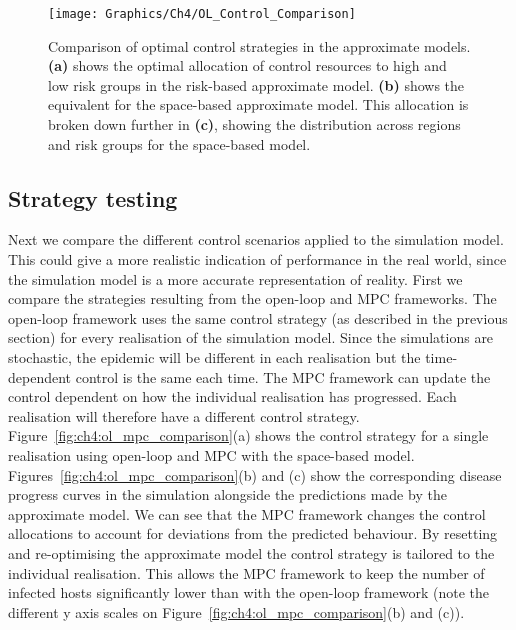 \begin{figure}[h]
    \begin{center}
        \texttt{[image: Graphics/Ch4/OL\_Control\_Comparison]}
        \caption[Optimised time-dependent control strategies]{Comparison of optimal control strategies in the approximate models. \textbf{(a)} shows the optimal allocation of control resources to high and low risk groups in the risk-based approximate model. \textbf{(b)} shows the equivalent for the space-based approximate model. This allocation is broken down further in \textbf{(c)}, showing the distribution across regions and risk groups for the space-based model.}
        \label{fig:ch4:opt_control_comparison}
    \end{center}
\end{figure}

\subsection{Strategy testing}

Next we compare the different control scenarios applied to the simulation model. This could give a more realistic indication of performance in the real world, since the simulation model is a more accurate representation of reality. First we compare the strategies resulting from the open-loop and MPC frameworks. The open-loop framework uses the same control strategy (as described in the previous section) for every realisation of the simulation model. Since the simulations are stochastic, the epidemic will be different in each realisation but the time-dependent control is the same each time. The MPC framework can update the control dependent on how the individual realisation has progressed. Each realisation will therefore have a different control strategy. Figure~\ref{fig:ch4:ol_mpc_comparison}(a) shows the control strategy for a single realisation using open-loop and MPC with the space-based model. Figures~\ref{fig:ch4:ol_mpc_comparison}(b) and (c) show the corresponding disease progress curves in the simulation alongside the predictions made by the approximate model. We can see that the MPC framework changes the control allocations to account for deviations from the predicted behaviour. By resetting and re-optimising the approximate model the control strategy is tailored to the individual realisation. This allows the MPC framework to keep the number of infected hosts significantly lower than with the open-loop framework (note the different y axis scales on Figure~\ref{fig:ch4:ol_mpc_comparison}(b) and (c)).

